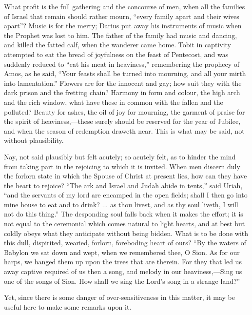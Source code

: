 What profit is the full gathering and the concourse of men, when
all the families of Israel that remain should rather mourn,
``every family apart and their wives apart''? Music is for the
merry; Darius put away his instruments of music when the Prophet was
lost to him. The father of the family had music and dancing, and
killed the fatted calf, when the wanderer came home. Tobit in
captivity attempted to eat the bread of joyfulness on the feast of
Pentecost, and was suddenly reduced to ``eat his meat in
heaviness,'' remembering the prophecy of Amos, as he said,
``Your feasts shall be turned into mourning, and all your mirth
into lamentation.'' Flowers are for the innocent and gay; how suit
they with the dark prison and the fretting chain? Harmony in form and
colour, the high arch and the rich window, what have these in common
with the fallen and the polluted? Beauty for ashes, the oil of joy for
mourning, the garment of praise for the spirit of heaviness,—these
surely should be reserved for the year of Jubilee, and when the season
of redemption draweth near. This is what may be said, not without
plausibility.

Nay, not said plausibly but felt acutely; so acutely felt, as to
hinder the mind from taking part in the rejoicing to which it is
invited. When men discern duly the forlorn state in which the Spouse
of Christ at present lies, how can they have the heart to rejoice?
``The ark and Israel and Judah abide in tents,'' said Uriah,
``and the servants of my lord are encamped in the open fields;
shall I then go into mine house to eat and to drink? ... as thou
livest, and as thy soul liveth, I will not do this thing.'' The
desponding soul falls back when it makes the effort; it is not equal
to the ceremonial which comes natural to light hearts, and at best but
coldly obeys what they anticipate without being bidden. What is to be
done with this dull, dispirited, wearied, forlorn, foreboding heart of
ours? ``By the waters of Babylon we sat down and wept, when we
remembered thee, O Sion. As for our harps, we hanged them up upon the
trees that are therein. For they that led us away captive required of
us then a song, and melody in our heaviness,—Sing us one of the
songs of Sion. How shall we sing the Lord's song in a strange
land?''

Yet, since there is some danger of over-sensitiveness in this
matter, it may be useful here to make some remarks upon it.

